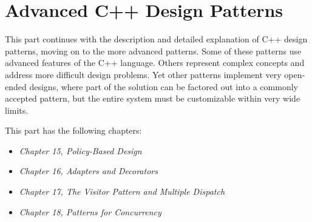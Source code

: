 \part{Advanced C++ Design Patterns}

This part continues with the description and detailed explanation of C++ design patterns, moving on to the more advanced patterns. Some of these patterns use advanced features of the C++ language. Others represent complex concepts and address more difficult design problems. Yet other patterns implement very open-ended designs, where part of the solution can be factored out into a commonly accepted pattern, but the entire system must be customizable within very wide limits.

This part has the following chapters:

\begin{itemize}
\item
  \emph{Chapter 15, Policy-Based Design}
\item
  \emph{Chapter 16, Adapters and Decorators}
\item
  \emph{Chapter 17, The Visitor Pattern and Multiple Dispatch}
\item
  \emph{Chapter 18, Patterns for Concurrency}
\end{itemize}

